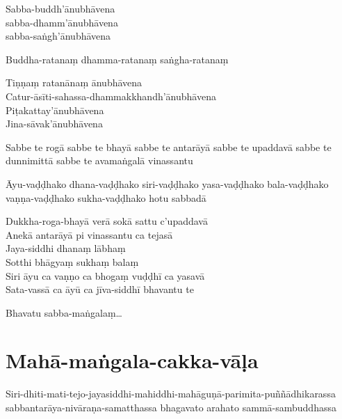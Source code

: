 \enlargethispage{\baselineskip}


Sabba-buddh'ānubhāvena\\
sabba-dhamm'ānubhāvena\\
sabba-saṅgh'ānubhāvena

Buddha-ratanaṃ dhamma-ratanaṃ saṅgha-ratanaṃ

Tiṇṇaṃ ratanānaṃ ānubhāvena\\
Catur-āsīti-sahassa-dhammakkhandh'ānubhāvena\\
Piṭakattay'ānubhāvena\\
Jina-sāvak'ānubhāvena

Sabbe te rogā sabbe te bhayā sabbe te antarāyā sabbe te upaddavā sabbe te
dunnimittā sabbe te avamaṅgalā vinassantu

Āyu-vaḍḍhako dhana-vaḍḍhako siri-vaḍḍhako yasa-vaḍḍhako bala-vaḍḍhako
vaṇṇa-vaḍḍhako sukha-vaḍḍhako hotu sabbadā

Dukkha-roga-bhayā verā sokā sattu c'upaddavā\\
Anekā antarāyā pi vinassantu ca tejasā\\
Jaya-siddhi dhanaṃ lābhaṃ\\
Sotthi bhāgyaṃ sukhaṃ balaṃ\\
Siri āyu ca vaṇṇo ca bhogaṃ vuḍḍhī ca yasavā\\
Sata-vassā ca āyū ca jīva-siddhī bhavantu te

Bhavatu sabba-maṅgalaṃ\ldots{}

\section{Mahā-maṅgala-cakka-vāḷa}


Siri-dhiti-mati-tejo-jayasiddhi-mahiddhi-mahāguṇā-parimita-puññādhikarassa
sabbantarāya-nivāraṇa-samatthassa bhagavato arahato sammā-sambuddhassa

